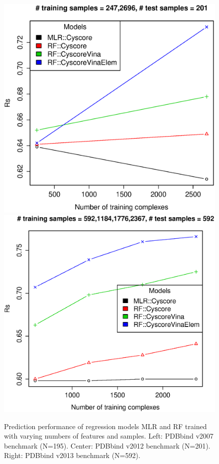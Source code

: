 \documentclass[journal=jacsat,manuscript=article]{achemso}
\begin{document}
\begin{figure}[ht!]
\includegraphics[width=\linewidth]{../rfcyscore/tst-201-scor.eps}
\endminipage
{}
\includegraphics[width=\linewidth]{../rfcyscore/tst-592-scor.eps}
\endminipage
\caption{Prediction performance of regression models MLR and RF trained with varying numbers of features and samples. Left: PDBbind v2007 benchmark (N=195). Center: PDBbind v2012 benchmark (N=201). Right: PDBbind v2013 benchmark (N=592).}
\label{fig:stat}
\end{figure}
\end{document}
